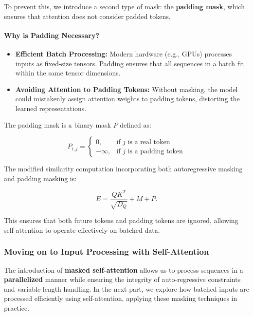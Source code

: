 \noindent To prevent this, we introduce a second type of mask: the \textbf{padding mask}, which ensures that attention does not consider padded tokens.

\paragraph{Why is Padding Necessary?}
\begin{itemize}
    \item \textbf{Efficient Batch Processing:} Modern hardware (e.g., GPUs) processes inputs as fixed-size tensors. Padding ensures that all sequences in a batch fit within the same tensor dimensions.
    \item \textbf{Avoiding Attention to Padding Tokens:} Without masking, the model could mistakenly assign attention weights to padding tokens, distorting the learned representations.
\end{itemize}

\noindent The padding mask is a binary mask \( P \) defined as:

\[
P_{i,j} =
\begin{cases}
    0, & \text{if } j \text{ is a real token} \\
    -\infty, & \text{if } j \text{ is a padding token}
\end{cases}
\]

\noindent The modified similarity computation incorporating both autoregressive masking and padding masking is:

\begin{equation}
    E = \frac{Q K^T}{\sqrt{D_Q}} + M + P.
\end{equation}

\noindent This ensures that both future tokens and padding tokens are ignored, allowing self-attention to operate effectively on batched data.

\subsubsection{Moving on to Input Processing with Self-Attention}

\noindent The introduction of \textbf{masked self-attention} allows us to process sequences in a \textbf{parallelized} manner while ensuring the integrity of auto-regressive constraints and variable-length handling. In the next part, we explore how batched inputs are processed efficiently using self-attention, applying these masking techniques in practice.

